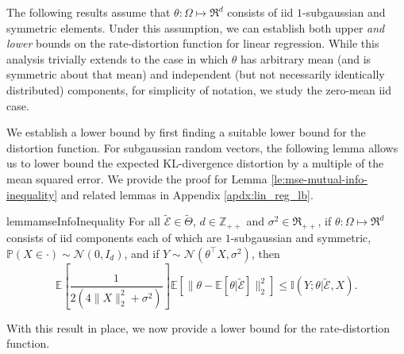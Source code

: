 \documentclass[twoside,11pt]{article}
\def\environment{\mathcal{E}}
\def\proxy{\tilde{\environment}}
\def\proxyset{\tilde{\Theta}}
\def\normal{\mathcal{N}}
\def\E{\mathbb{E}}
\def\I{\mathbb{I}}
\def\Pr{\mathbb{P}}
\begin{document}
The following results assume that $\theta:\Omega\mapsto\Re^d$ consists of iid $1$-subgaussian and symmetric elements. Under this assumption, we can establish both upper \emph{and lower} bounds on the rate-distortion function for linear regression. While this analysis trivially extends to the case in which $\theta$ has arbitrary mean (and is symmetric about that mean) and independent (but not necessarily identically distributed) components, for simplicity of notation, we study the zero-mean iid case.

We establish a lower bound by first finding a suitable lower bound for the distortion function. For subgaussian random vectors, the following lemma allows us to lower bound the expected KL-divergence distortion by a multiple of the mean squared error. We provide the proof for Lemma \ref{le:mse-mutual-info-inequality} and related lemmas in Appendix \ref{apdx:lin_reg_lb}.
\begin{restatable}{lemma}{mseInfoInequality}
    \label{le:mse-mutual-info-inequality}
    For all $\proxy\in\proxyset$, $d \in \mathbb{Z}_{++}$ and $\sigma^2 \in \Re_{++}$, if $\theta:\Omega\mapsto\Re^d$ consists of iid components each of which are $1$-subgaussian and symmetric, $\Pr(X\in\cdot)\sim \normal(0, I_d)$, and if $Y \sim \normal(\theta^\top X, \sigma^2)$, then
    $$\E\left[\frac{1}{2(4\|X\|_2^2 + \sigma^2)}\right]\E\left[\|\theta - \E[\theta|\proxy]\|^2_2\right] \leq \I(Y;\theta|\proxy, X).$$
\end{restatable}

With this result in place, we now provide a lower bound for the rate-distortion function.
\end{document}
